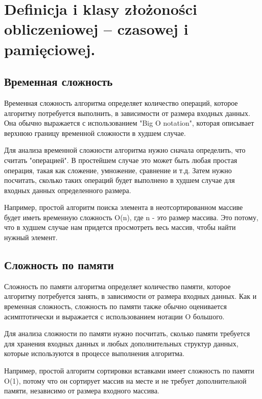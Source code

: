 \section{Definicja i klasy złożoności obliczeniowej – czasowej i pamięciowej.}

\subsection*{Временная сложность}

Временная сложность алгоритма определяет количество операций, которое алгоритму потребуется выполнить, в зависимости от размера входных данных. Она обычно выражается с использованием "Big O notation", которая описывает верхнюю границу временной сложности в худшем случае.

Для анализа временной сложности алгоритма нужно сначала определить, что считать "операцией". В простейшем случае это может быть любая простая операция, такая как сложение, умножение, сравнение и т.д. Затем нужно посчитать, сколько таких операций будет выполнено в худшем случае для входных данных определенного размера.

Например, простой алгоритм поиска элемента в неотсортированном массиве будет иметь временную сложность O(n), где n - это размер массива. Это потому, что в худшем случае нам придется просмотреть весь массив, чтобы найти нужный элемент.

\subsection*{Сложность по памяти}

Сложность по памяти алгоритма определяет количество памяти, которое алгоритму потребуется занять, в зависимости от размера входных данных. Как и временная сложность, сложность по памяти также обычно оценивается асимптотически и выражается с использованием нотации O большого.

Для анализа сложности по памяти нужно посчитать, сколько памяти требуется для хранения входных данных и любых дополнительных структур данных, которые используются в процессе выполнения алгоритма.

Например, простой алгоритм сортировки вставками имеет сложность по памяти O(1), потому что он сортирует массив на месте и не требует дополнительной памяти, независимо от размера входного массива.


